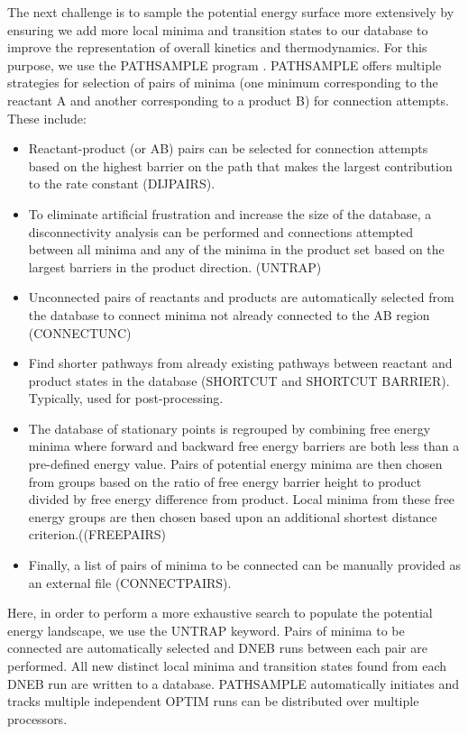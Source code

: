 \documentclass[journal=jacsat]{achemso}
\begin{document}
The next challenge is to sample the potential energy surface more extensively by ensuring we add more local minima and transition states to our database  to improve the representation of overall kinetics and thermodynamics. For this purpose, we use the PATHSAMPLE program \cite{PATHSAMPLE}. PATHSAMPLE offers multiple strategies for selection of pairs of minima (one minimum corresponding to the reactant A and another corresponding to a product B) for connection attempts. These include:
\begin{itemize}
    \item {Reactant-product (or AB) pairs can be selected for connection attempts based on the highest barrier on the path that makes the largest contribution to the rate constant  (DIJPAIRS\cite{Strodel07a}).}
    \item{To eliminate artificial frustration and increase the size of the database, a disconnectivity analysis can be performed and connections attempted between all minima and any of the minima in the product set based on the largest barriers in the product direction.  (UNTRAP\cite{Strodel07a})}
    \item{Unconnected pairs of reactants and products are automatically selected from the database to connect minima not already connected to the AB region (CONNECTUNC\cite{Roder18a})}
    \item{Find shorter pathways from already existing pathways between reactant and product states in the database (SHORTCUT and SHORTCUT BARRIER\cite{Carr05a,Strodel07a}). Typically, used for post-processing.}
    \item {The database of stationary points is regrouped by combining free energy minima where forward and backward free energy barriers are both less than a pre-defined energy value. Pairs of potential energy minima are then  chosen from groups based on the ratio of free energy barrier height to product divided by free energy difference from product. Local minima from these free energy groups are then chosen based upon an additional shortest distance criterion.((FREEPAIRS\cite{Carr08a})}
    \item{Finally, a list of pairs of minima to be connected can be manually provided as an external file (CONNECTPAIRS). }
\end{itemize}


Here, in order to perform a more exhaustive search to populate the potential energy landscape, we use the UNTRAP\cite{Strodel07a} keyword. Pairs of minima to be connected are automatically selected and DNEB runs between each pair are performed. All new distinct local minima and transition states found from each DNEB run are written to a database. PATHSAMPLE automatically initiates and tracks multiple independent OPTIM runs can be distributed over multiple processors. 
\end{document}
